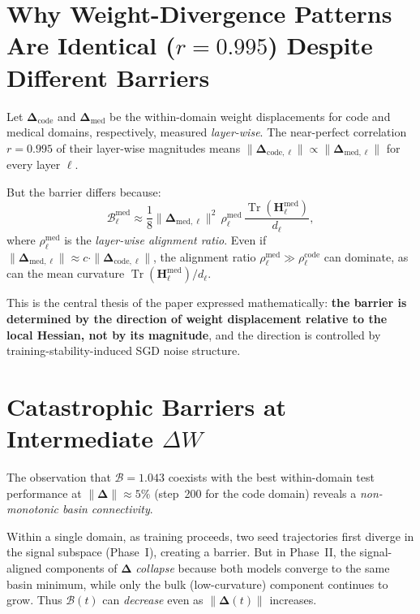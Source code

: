 \documentclass{article}
\DeclareMathOperator{\Tr}{Tr}
\newcommand{\Hess}{\mathbf{H}}
\newcommand{\bDelta}{\bm{\Delta}}
\begin{document}
\section{Why Weight-Divergence Patterns Are Identical ($r=0.995$) Despite Different Barriers}

Let $\bDelta_{\mathrm{code}}$ and $\bDelta_{\mathrm{med}}$ be the within-domain weight
displacements for code and medical domains, respectively, measured \emph{layer-wise}.
The near-perfect correlation $r=0.995$ of their layer-wise magnitudes means
$\|\bDelta_{\mathrm{code},\ell}\| \propto \|\bDelta_{\mathrm{med},\ell}\|$ for every layer $\ell$.

But the barrier differs because:
\begin{equation}
\mathcal{B}^{\mathrm{med}}_\ell \approx \frac{1}{8}\|\bDelta_{\mathrm{med},\ell}\|^2\,
\rho_\ell^{\mathrm{med}}\,\frac{\Tr(\Hess_\ell^{\mathrm{med}})}{d_\ell},
\end{equation}
where $\rho_\ell^{\mathrm{med}}$ is the \emph{layer-wise alignment ratio}.
Even if $\|\bDelta_{\mathrm{med},\ell}\| \approx c\cdot\|\bDelta_{\mathrm{code},\ell}\|$,
the alignment ratio $\rho_\ell^{\mathrm{med}} \gg \rho_\ell^{\mathrm{code}}$ can dominate,
as can the mean curvature $\Tr(\Hess_\ell^{\mathrm{med}})/d_\ell$.

This is the central thesis of the paper expressed mathematically: \textbf{the barrier is
determined by the direction of weight displacement relative to the local Hessian, not by
its magnitude}, and the direction is controlled by training-stability-induced SGD noise structure.

\section{Catastrophic Barriers at Intermediate $\Delta W$}

The observation that $\mathcal{B}=1.043$ coexists with the best within-domain test
performance at $\|\bDelta\|\approx5\%$ (step~200 for the code domain) reveals a
\emph{non-monotonic basin connectivity}.

Within a single domain, as training proceeds, two seed trajectories first diverge
in the signal subspace (Phase~I), creating a barrier. But in Phase~II, the signal-aligned
components of $\bDelta$ \emph{collapse} because both models converge to the same
basin minimum, while only the bulk (low-curvature) component continues to grow.
Thus $\mathcal{B}(t)$ can \emph{decrease} even as $\|\bDelta(t)\|$ increases.
\end{document}
